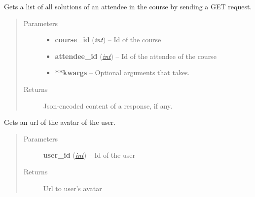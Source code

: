 \documentclass[letterpaper,10pt,english]{sphinxmanual}
\begin{document}
\begin{fulllineitems}
\label{web_portal:core.courses.api.get_attendee_solutions}
Gets a list of all solutions of an attendee in the course by sending a
GET request.
\begin{quote}\begin{description}
\item[{Parameters}] \leavevmode\begin{itemize}
\item {} 
\textbf{course\_id} (\href{http://docs.python.org/library/functions.html\#int}{\emph{int}}) -- Id of the course

\item {} 
\textbf{attendee\_id} (\href{http://docs.python.org/library/functions.html\#int}{\emph{int}}) -- Id of the attendee of the course

\item {} 
\textbf{**kwargs} -- Optional arguments that  takes.

\end{itemize}

\item[{Returns}] \leavevmode
Json-encoded content of a response, if any.

\end{description}\end{quote}

\end{fulllineitems}


\begin{fulllineitems}
\label{web_portal:core.courses.api.get_user_avatar_url}
Gets an url of the avatar of the user.
\begin{quote}\begin{description}
\item[{Parameters}] \leavevmode
\textbf{user\_id} (\href{http://docs.python.org/library/functions.html\#int}{\emph{int}}) -- Id of the user

\item[{Returns}] \leavevmode
Url to user's avatar

\end{description}\end{quote}

\end{fulllineitems}
\end{document}

